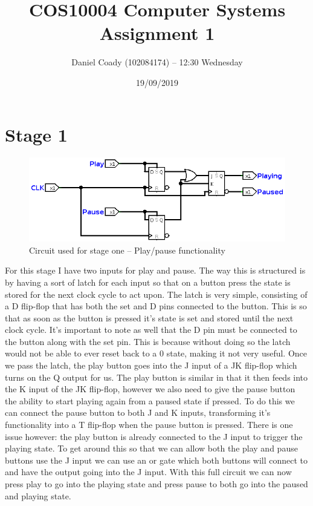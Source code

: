 \documentclass[11pt]{scrartcl}
\title{COS10004 Computer Systems Assignment 1}
\author{Daniel Coady (102084174) -- 12:30 Wednesday}
\date{19/09/2019}
\begin{document}
\maketitle

\pagebreak

\section*{Stage 1}
\begin{figure}[h]
    \centering
    \includegraphics[scale=0.5]{images/stageone.png}
    \caption{Circuit used for stage one -- Play/pause functionality}
\end{figure}
For this stage I have two inputs for play and pause. The way this is structured is by having
a sort of latch for each input so that on a button press the state is stored for the next
clock cycle to act upon. The latch is very simple, consisting of a D flip-flop that has both
the set and D pins connected to the button. This is so that as soon as the button is pressed
it's state is set and stored until the next clock cycle. It's important to note as well that
the D pin must be connected to the button along with the set pin. This is because without
doing so the latch would not be able to ever reset back to a 0 state, making it not very useful.
Once we pass the latch, the play button goes into the J input of a JK flip-flop which turns
on the Q output for us. The play button is similar in that it then feeds into the K input of
the JK flip-flop, however we also need to give the pause button the ability to start playing
again from a paused state if pressed. To do this we can connect the pause button to both J and
K inputs, transforming it's functionality into a T flip-flop when the pause button is pressed.
There is one issue however: the play button is already connected to the J input to trigger the
playing state. To get around this so that we can allow both the play and pause buttons use the
J input we can use an or gate which both buttons will connect to and have the output going into
the J input. With this full circuit we can now press play to go into the playing state and
press pause to both go into the paused and playing state.
\end{document}

